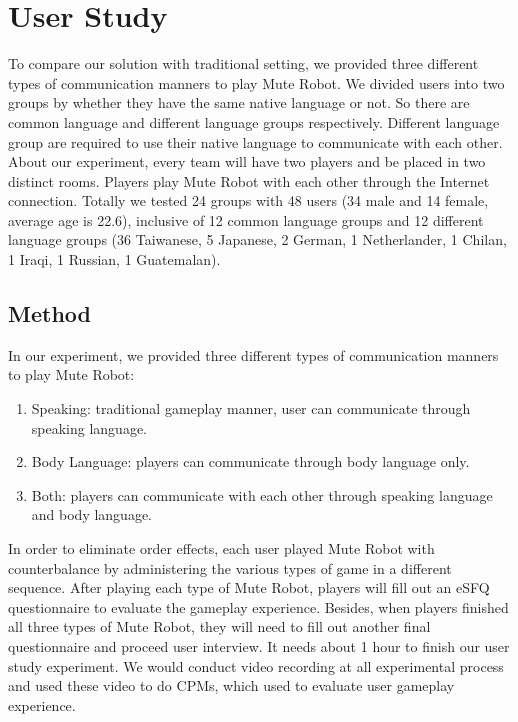 \section{User Study}

To compare our solution with traditional setting, we provided three different types of communication manners to play Mute Robot. We divided users into two groups by whether they have the same native language or not. So there are common language and different language groups respectively. Different language group are required to use their native language to communicate with each other. About our experiment, every team will have two players and be placed in two distinct rooms. Players play Mute Robot with each other through the Internet connection. Totally we tested 24 groups with 48 users (34 male and 14 female, average age is 22.6), inclusive of 12 common language groups and 12 different language groups (36 Taiwanese, 5 Japanese, 2 German, 1 Netherlander, 1 Chilan, 1 Iraqi, 1 Russian, 1 Guatemalan).

\subsection{Method}

In our experiment, we provided three different types of communication manners to play Mute Robot:
\begin{enumerate}
    \item Speaking: 
    traditional gameplay manner, user can communicate through speaking language.
    \item Body Language: 
    players can communicate through body language only.
    \item Both:
    players can communicate with each other through speaking language and body language.
\end{enumerate}

In order to eliminate order effects, each user played Mute Robot with counterbalance by administering the various types of game in a different sequence. After playing each type of Mute Robot, players will fill out an eSFQ\cite{eSFQ} questionnaire to evaluate the gameplay experience. Besides, when players finished all three types of Mute Robot, they will need to fill out another final questionnaire and proceed user interview. It needs about 1 hour to finish our user study experiment. We would conduct video recording at all experimental process and used these video to do CPMs\cite{CPMs}, which used to evaluate user gameplay experience.
  

